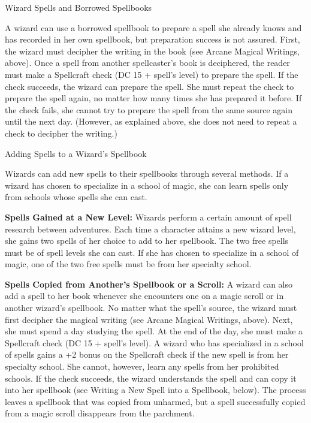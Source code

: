 \documentclass{article}
\begin{document}
\vspace{12pt}
Wizard Spells and Borrowed Spellbooks

A wizard can use a borrowed spellbook to prepare a spell she already knows and 
has recorded in her own spellbook, but preparation success is not assured. First, 
the wizard must decipher the writing in the book (see Arcane Magical Writings, 
above). Once a spell from another spellcaster's book is deciphered, the reader 
must make a Spellcraft check (DC 15 + spell's level) to prepare the spell. If the 
check succeeds, the wizard can prepare the spell. She must repeat the check to 
prepare the spell again, no matter how many times she has prepared it before. If 
the check fails, she cannot try to prepare the spell from the same source again 
until the next day. (However, as explained above, she does not need to repeat a 
check to decipher the writing.)

\vspace{12pt}
Adding Spells to a Wizard's Spellbook

Wizards can add new spells to their spellbooks through several methods. If a wizard 
has chosen to specialize in a school of magic, she can learn spells only from schools 
whose spells she can cast.

\textbf{Spells Gained at a New Level: }Wizards perform a certain amount of spell 
research between adventures. Each time a character attains a new wizard level, 
she gains two spells of her choice to add to her spellbook. The two free spells 
must be of spell levels she can cast. If she has chosen to specialize in a school 
of magic, one of the two free spells must be from her specialty school.

\textbf{Spells Copied from Another's Spellbook or a Scroll:} A wizard can also 
add a spell to her book whenever she encounters one on a magic scroll or in another 
wizard's spellbook. No matter what the spell's source, the wizard must first decipher 
the magical writing (see Arcane Magical Writings, above). Next, she must spend 
a day studying the spell. At the end of the day, she must make a Spellcraft check 
(DC 15 + spell's level). A wizard who has specialized in a school of spells gains 
a +2 bonus on the Spellcraft check if the new spell is from her specialty school. 
She cannot, however, learn any spells from her prohibited schools. If the check 
succeeds, the wizard understands the spell and can copy it into her spellbook (see 
Writing a New Spell into a Spellbook, below). The process leaves a spellbook that 
was copied from unharmed, but a spell successfully copied from a magic scroll disappears 
from the parchment.
\end{document}
